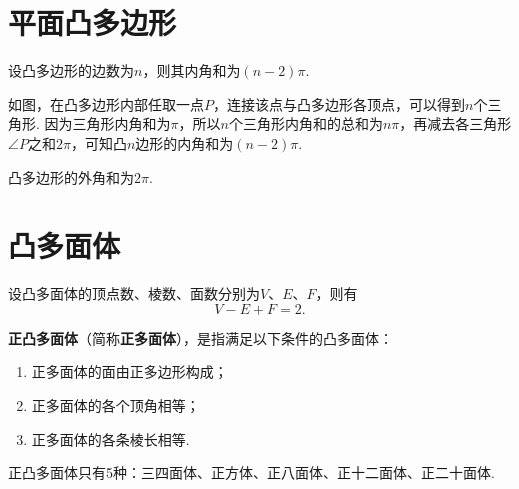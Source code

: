 \section{平面凸多边形}
\begin{theorem}
设凸多边形的边数为\(n\)，则其内角和为\((n-2)\pi\).
\end{theorem}
如图，在凸多边形内部任取一点\(P\)，连接该点与凸多边形各顶点，可以得到\(n\)个三角形.
因为三角形内角和为\(\pi\)，所以\(n\)个三角形内角和的总和为\(n\pi\)，再减去各三角形\(\angle P\)之和\(2\pi\)，可知凸\(n\)边形的内角和为\((n-2)\pi\).
\begin{center}
\end{center}

\begin{theorem}
凸多边形的外角和为\(2\pi\).
\end{theorem}

\section{凸多面体}
\begin{theorem}[欧拉公式]
设凸多面体的顶点数、棱数、面数分别为\(V\)、\(E\)、\(F\)，则有\[
V - E + F = 2.
\]
\end{theorem}

\begin{definition}
\textbf{正凸多面体}（简称\textbf{正多面体}），是指满足以下条件的凸多面体：
\begin{enumerate}
\item 正多面体的面由正多边形构成；
\item 正多面体的各个顶角相等；
\item 正多面体的各条棱长相等.
\end{enumerate}
\end{definition}

\begin{corollary}
正凸多面体只有5种：三四面体、正方体、正八面体、正十二面体、正二十面体.
\end{corollary}
